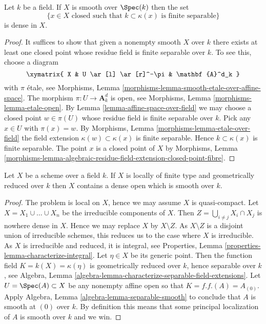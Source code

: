 \begin{lemma}
\label{lemma-smooth-separable-closed-points-dense}
Let $k$ be a field. If $X$ is smooth over $\Spec(k)$ then
the set
$$
\{x \in X\text{ closed such that }k \subset \kappa(x)
\text{ is finite separable}\}
$$
is dense in $X$.
\end{lemma}

\begin{proof}
It suffices to show that given a nonempty smooth $X$ over $k$
there exists at least one closed point whose residue field is
finite separable over $k$. To see this, choose a diagram
$$
\xymatrix{
X & U \ar[l] \ar[r]^-\pi & \mathbf{A}^d_k
}
$$
with $\pi$ \'etale, see
Morphisms, Lemma \ref{morphisms-lemma-smooth-etale-over-affine-space}.
The morphism $\pi : U \to \mathbf{A}^d_k$ is open, see
Morphisms, Lemma \ref{morphisms-lemma-etale-open}.
By
Lemma \ref{lemma-affine-space-over-field}
we may choose a closed point $w \in \pi(U)$ whose residue field is
finite separable over $k$. Pick any $x \in U$ with $\pi(x) = w$. By
Morphisms, Lemma \ref{morphisms-lemma-etale-over-field}
the field extension $\kappa(w) \subset \kappa(x)$ is finite separable.
Hence $k \subset \kappa(x)$ is finite separable. The point $x$ is a
closed point of $X$ by
Morphisms, Lemma
\ref{morphisms-lemma-algebraic-residue-field-extension-closed-point-fibre}.
\end{proof}

\begin{lemma}
\label{lemma-geometrically-reduced-dense-smooth-open}
Let $X$ be a scheme over a field $k$.
If $X$ is locally of finite type and geometrically reduced over $k$
then $X$ contains a dense open which is smooth over $k$.
\end{lemma}

\begin{proof}
The problem is local on $X$, hence we may assume $X$ is quasi-compact.
Let $X = X_1 \cup \ldots \cup X_n$ be the irreducible components of $X$.
Then $Z = \bigcup_{i \not = j} X_i \cap X_j$ is nowhere dense in $X$.
Hence we may replace $X$ by $X \setminus Z$. As $X \setminus Z$ is a
disjoint union of irreducible schemes, this reduces us to the case
where $X$ is irreducible. As $X$ is irreducible and reduced, it is
integral, see
Properties, Lemma \ref{properties-lemma-characterize-integral}.
Let $\eta \in X$ be its generic point.
Then the function field $K = k(X) = \kappa(\eta)$ is geometrically
reduced over $k$, hence separable over $k$, see
Algebra, Lemma \ref{algebra-lemma-characterize-separable-field-extensions}.
Let $U = \Spec(A) \subset X$ be any nonempty affine open
so that $K = f.f.(A) = A_{(0)}$. Apply
Algebra, Lemma \ref{algebra-lemma-separable-smooth}
to conclude that $A$ is smooth at $(0)$ over $k$.
By definition this means that some principal localization
of $A$ is smooth over $k$ and we win.
\end{proof}

